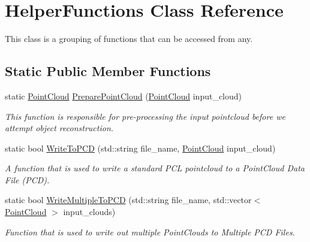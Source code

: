 \hypertarget{class_helper_functions}{\section{\-Helper\-Functions \-Class \-Reference}
\label{class_helper_functions}
}


\-This class is a grouping of functions that can be accessed from any.  


\subsection*{\-Static \-Public \-Member \-Functions}
\begin{DoxyCompactItemize}
\item 
static \hyperlink{_helper_functions_8h_abb956d1047f4dd2c956fe3cb0dd0004d}{\-Point\-Cloud} \hyperlink{class_helper_functions_a2e817646b20092d5f7179ba89635b50f}{\-Prepare\-Point\-Cloud} (\hyperlink{_helper_functions_8h_abb956d1047f4dd2c956fe3cb0dd0004d}{\-Point\-Cloud} input\-\_\-cloud)
\begin{DoxyCompactList}\small\item\em \-This function is responsible for pre-\/processing the input pointcloud before we attempt object reconstruction. \end{DoxyCompactList}\item 
static bool \hyperlink{class_helper_functions_a4b25abbfbd620e9218b2949c758a8872}{\-Write\-To\-P\-C\-D} (std\-::string file\-\_\-name, \hyperlink{_helper_functions_8h_abb956d1047f4dd2c956fe3cb0dd0004d}{\-Point\-Cloud} input\-\_\-cloud)
\begin{DoxyCompactList}\small\item\em \-A function that is used to write a standard \-P\-C\-L pointcloud to a \-Point\-Cloud \-Data \-File (\-P\-C\-D). \end{DoxyCompactList}\item 
static bool \hyperlink{class_helper_functions_a4428222439104c10e58e04958a231c37}{\-Write\-Multiple\-To\-P\-C\-D} (std\-::string file\-\_\-name, std\-::vector$<$ \hyperlink{_helper_functions_8h_abb956d1047f4dd2c956fe3cb0dd0004d}{\-Point\-Cloud} $>$ input\-\_\-clouds)
\begin{DoxyCompactList}\small\item\em \-Function that is used to write out multiple \-Point\-Clouds to \-Multiple \-P\-C\-D \-Files. \end{DoxyCompactList}\end{DoxyCompactItemize}


